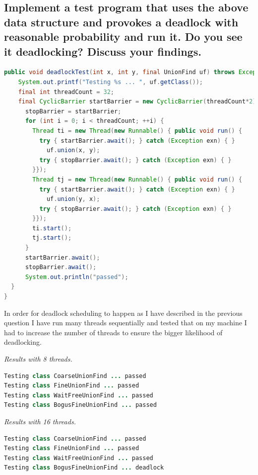 \documentclass[format=acmsmall, review=false, screen=true]{acmart}
\begin{document}
\subsection{Implement a test program that uses the above data structure and provokes a deadlock with reasonable probability and run it. Do you see it deadlocking? Discuss your findings.}

\begin{lstlisting}[language=java]
  public void deadlockTest(int x, int y, final UnionFind uf) throws Exception {
    System.out.printf("Testing %s ... ", uf.getClass());
    final int threadCount = 32;
    final CyclicBarrier startBarrier = new CyclicBarrier(threadCount*2),
      stopBarrier = startBarrier;
      for (int i = 0; i < threadCount; ++i) {
        Thread ti = new Thread(new Runnable() { public void run() {
          try { startBarrier.await(); } catch (Exception exn) { }
            uf.union(x, y);
          try { stopBarrier.await(); } catch (Exception exn) { }
        }});
        Thread tj = new Thread(new Runnable() { public void run() {
          try { startBarrier.await(); } catch (Exception exn) { }
            uf.union(y, x);
          try { stopBarrier.await(); } catch (Exception exn) { }
        }});
        ti.start();
        tj.start();
      }
      startBarrier.await();
      stopBarrier.await();
      System.out.println("passed");
  }
}
\end{lstlisting}

In order for deadlock scheduling to happen as I have described in the previous question I have run many threads sequentially and tested that on my machine I had to increase the number of threads to ensure the bigger likelihood of deadlocking.

\textit{Results with 8 threads.}

\begin{lstlisting}[language=java]
Testing class CoarseUnionFind ... passed
Testing class FineUnionFind ... passed
Testing class WaitFreeUnionFind ... passed
Testing class BogusFineUnionFind ... passed
\end{lstlisting}

\textit{Results with 16 threads.}

\begin{lstlisting}[language=java]
Testing class CoarseUnionFind ... passed
Testing class FineUnionFind ... passed
Testing class WaitFreeUnionFind ... passed
Testing class BogusFineUnionFind ... deadlock
\end{lstlisting}
\end{document}
